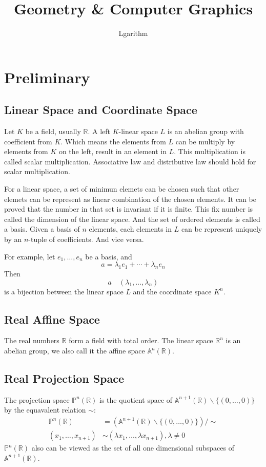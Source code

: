 \documentclass{article}
\title{Geometry \& Computer Graphics}
\author{Lgarithm}
\begin{document}

\section{Preliminary}
\subsection{Linear Space and Coordinate Space}
Let $K$ be a field, usually $\mathbb R$. 
A left $K$-linear space $L$ is an abelian group with coefficient from $K$.
Which means the elements from $L$ can be multiply by elements from $K$ on the left, 
result in an element in $L$. This multiplication is called scalar multiplication. 
Associative law and distributive law should hold for scalar multiplication. 

For a linear space, a set of minimun elemets can be chosen such that other elemets can be represent
as linear combination of the chosen elements. 
It can be proved that the number in that set is invariant if it is finite. This fix number is called 
the dimension of the linear space. And the set of ordered elements is called a basis. 
Given a basis of $n$ elements, each elements in $L$ can be represent uniquely by an $n$-tuple of coefficients.
And vice versa.

For example, let $e_1, \dots, e_n$ be a basis, and 
$$a = \lambda_1 e_1 + \cdots + \lambda_n e_n$$
Then 
$$a \quad  (\lambda_1, \dots, \lambda_n)$$
is a bijection between the linear space $L$ and the coordinate space $K^n$.


\subsection{Real Affine Space}
The real numbers $\mathbb{R}$ form a field with total order.
The linear space $\mathbb{R}^n$ is an abelian group, we also call 
it the affine space $\mathbb{A}^n(\mathbb{R})$.

\subsection{Real Projection Space}
The projection space $\mathbb{P}^n(\mathbb{R})$ is the quotient space
of $\mathbb{A}^{n+1}(\mathbb{R}) \backslash \{(0, \dots, 0)\}$ by the equavalent relation $\sim$:
\begin{align*}
\mathbb{P}^n(\mathbb{R}) &= (\mathbb{A}^{n+1}(\mathbb{R}) \backslash \{(0, \dots, 0)\}) / \sim \\
(x_1, \dots, x_{n+1}) &\sim (\lambda x_1, \dots, \lambda x_{n+1}), \lambda \neq 0
\end{align*}
$\mathbb{P}^n(\mathbb{R})$ also can be viewed as the set of all one dimensional subspaces of $\mathbb{A}^{n+1}(\mathbb{R})$.
\end{document}
